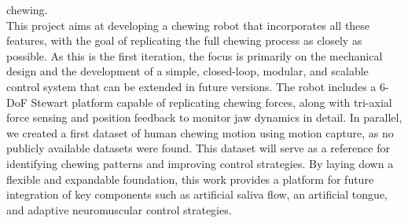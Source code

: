 chewing.\\
This project aims at developing a chewing robot that incorporates all these features, with the goal of replicating the full chewing process as closely as 
possible. As this is the first iteration, the focus is primarily on the mechanical design and the development of a simple, closed-loop, modular, and scalable 
control system that can be extended in future versions. The robot includes a 6-DoF Stewart platform capable of replicating chewing forces, along with 
tri-axial force sensing and position feedback to monitor jaw dynamics in detail. In parallel, we created a first dataset of human chewing motion using 
motion capture, as no publicly available datasets were found. This dataset will serve as a reference for identifying chewing patterns and 
improving control strategies. By laying down a flexible and expandable foundation, this work provides a platform for future integration of key components 
such as artificial saliva flow, an artificial tongue, and adaptive neuromuscular control strategies.
